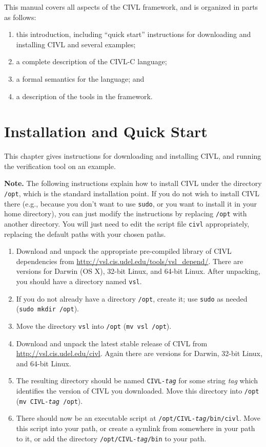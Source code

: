 This manual covers all aspects of the CIVL framework, and is organized in parts
as follows:
\begin{enumerate}
\item this introduction, including ``quick start'' instructions for
  downloading and installing CIVL and several examples;
\item a complete description of the CIVL-C language;
\item a formal semantics for the language; and
\item a description of the tools in the framework.
\end{enumerate}

\chapter{Installation and Quick Start}

This chapter gives instructions for downloading and installing CIVL,
and running the verification tool on an example.

\textbf{Note.} The following instructions explain how to install CIVL
under the directory \texttt{/opt}, which is the standard installation
point. If you do not wish to install CIVL there (e.g., because you
don't want to use \texttt{sudo}, or you want to install it in your
home directory), you can just modify the instructions by replacing
\texttt{/opt} with another directory. You will just need to edit the
script file \texttt{civl} appropriately, replacing the default paths
with your chosen paths.

\begin{enumerate}
\item Download and unpack the appropriate pre-compiled library of CIVL
  dependencies from
  \url{http://vsl.cis.udel.edu/tools/vsl_depend/}.
  There are versions for Darwin (OS X), 32-bit Linux, and 64-bit Linux.
  After unpacking, you should have a directory named \texttt{vsl}.
\item If you do not already have a directory \texttt{/opt},
  create it; use \texttt{sudo} as needed (\verb!sudo mkdir /opt!).
\item Move the directory \texttt{vsl} into \texttt{/opt}
  (\verb!mv vsl /opt!).
\item Download and unpack the latest stable release of CIVL from 
  \url{http://vsl.cis.udel.edu/civl}.  Again there are versions
  for Darwin, 32-bit Linux, and 64-bit Linux.
\item The resulting directory should be named
  \texttt{CIVL-\textit{tag}} for some string \textit{tag} which
  identifies the version of CIVL you downloaded.  Move this directory
  into \texttt{/opt} (\texttt{mv\ CIVL-\textit{tag}\ /opt}).
\item There should now be an executable script at
  \texttt{/opt/CIVL-\textit{tag}/bin/civl}.  Move this script into
  your path, or create a symlink from somewhere in your path to it, or
  add the directory \texttt{/opt/CIVL-\textit{tag}/bin} to your path.
\end{enumerate}

